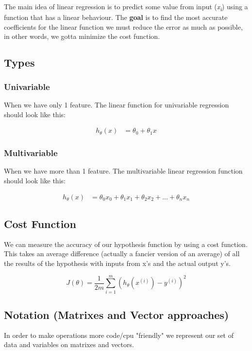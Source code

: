 The main idea of linear regression is to predict some value from input (\textit{x\textsubscript{i}}) using a function that has a linear behaviour. The \textbf{goal} is to find the most accurate coefficients for the linear function we must reduce the error as much as possible, in other words, we gotta minimize the cost function.

\subsection{Types}
\subsubsection{Univariable}
When we have only 1 feature. The linear function for univariable regression should look like this:

\begin{align}
	h_{\theta}(x) & = \theta_{0} + \theta_{1}x
\end{align}

\subsubsection{Multivariable}
When we have more than 1 feature. The multivariable linear regression function should look like this:

\begin{align}
	h_{\theta}(x) & = \theta_{0}x_{0} + \theta_{1}x_{1} + \theta_{2}x_{2} + ... + \theta_{n}x_{n}
\end{align}

\subsection{Cost Function}
We can measure the accuracy of our hypothesis function by using a cost function. This takes an average difference (actually a fancier version of an average) of all the results of the hypothesis with inputs from x's and the actual output y's.

$$J(\theta) = \frac{1}{2m}\sum_{i=1}^{m} (h_{\theta}(x^{(i)}) - y^{(i)})^2$$

\subsection{Notation (Matrixes and Vector approaches)}
In order to make operations more code/cpu "friendly" we represent our set of data and variables on matrixes and vectors.

